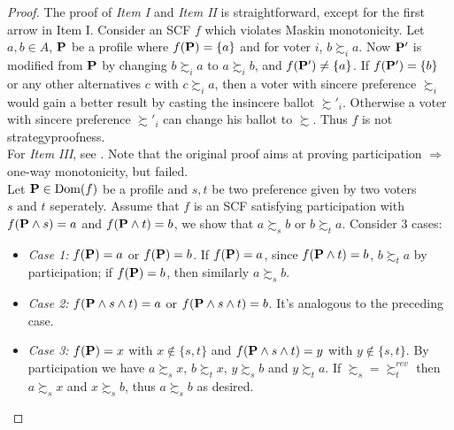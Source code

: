 \begin{proof}
    The proof of \textit{Item I} and \textit{Item II} is straightforward, except for the first arrow in Item I. Consider an SCF $f$ which violates Maskin monotonicity. Let $a, b \in A$, $\mathbf{P}$ be a profile where $f(\mathbf{P}) = \{a\}$ and for voter $i$, $b \succsim_i a$. Now $\mathbf{P}'$ is modified from $\mathbf{P}$ by changing $b \succsim_i a$ to $a \succsim_i b$, and $f(\mathbf{P}') \neq \{a\}$. 
    If $f(\mathbf{P}') = \{b\}$ or any other alternatives $c$ with $c \succsim_i a$, then a voter with sincere preference $\succsim_i$ would gain a better result by casting the insincere ballot $\succsim'_i$. Otherwise a voter with sincere preference $\succsim'_i$ can change his ballot to $\succsim$. Thus $f$ is not strategyproofness.\\
    For \textit{Item III}, see \textcite{sanver_one-way_2009}. Note that the original proof aims at proving participation $\Rightarrow$ one-way monotonicity,  but failed.\\
    Let $\mathbf{P} \in \mathrm{Dom}(f)$ be a profile and $s,t$ be two preference given by two voters $s \mbox{ and } t$ seperately. Assume that $f$ is an SCF satisfying participation with $f(\mathbf{P} \wedge s) = a$ and $f(\mathbf{P} \wedge t) = b$, we show that $a \succsim_s b$ or $b \succsim_t a$. Consider 3 cases:
    \begin{itemize}
        \item \textit{Case 1:} $f(\mathbf{P}) = a$ or $f(\mathbf{P}) = b$. If $f(\mathbf{P}) = a$, since $f(\mathbf{P} \wedge t) = b$, $b \succsim_t a$ by participation; if $f(\mathbf{P}) = b$, then similarly $a \succsim_s b$.
        \item \textit{Case 2:} $f(\mathbf{P} \wedge s \wedge t) = a$ or $f(\mathbf{P} \wedge s \wedge t) = b$. It's analogous to the preceding case.
        \item \textit{Case 3:} $f(\mathbf{P}) = x$ with $x \not \in \{s,t\}$ and $f(\mathbf{P} \wedge s \wedge t) = y$ with $y \not \in \{s,t\}$. By participation we have $a \succsim_s x$, $b \succsim_t x$, $y \succsim_s b$ and $y \succsim_t a$. If $\succsim_s = \succsim^{rev}_t$ then $a \succsim_s x$ and $x \succsim_s b$, thus $a \succsim_s b$ as desired.
    \end{itemize}
\end{proof}